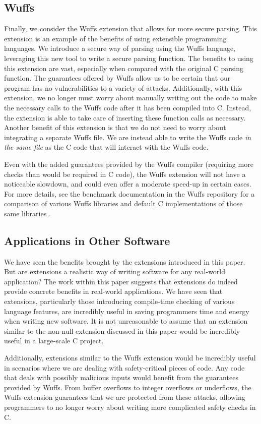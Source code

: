 \documentclass[main.tex]{subfiles}
\begin{document}
\subsection{Wuffs}
Finally, we consider the Wuffs extension that allows for more secure parsing. This extension is an example of
the benefits of using extensible programming languages. We introduce a secure way of parsing using the Wuffs language,
leveraging this new tool to write a secure parsing function. The benefits to using this extension are vast, especially when
compared with the original C parsing function. The guarantees offered by Wuffs allow us to be certain that our program has
no vulnerabilities to a variety of attacks. Additionally, with this extension, we no longer must worry about manually writing out
the code to make the necessary calls to the Wuffs code after it has been compiled into C. Instead, the extension is able to
take care of inserting these function calls as necessary. Another benefit of this extension is that we do not need to worry about
integrating a separate Wuffs file. We are instead able to write the Wuffs code \emph{in the same file} as the C code that will interact with
the Wuffs code.

Even with the added guarantees provided by the Wuffs compiler (requiring more checks than would be required in C code),
the Wuffs extension will not have a noticeable slowdown, and could even offer a moderate speed-up in certain cases. For
more details, see the benchmark documentation in the Wuffs repository for a comparison of various Wuffs libraries and
default C implementations of those same libraries \cite{6}. 

\subsection{Applications in Other Software}
We have seen the benefits brought by the extensions introduced in this paper. But are extensions a realistic way of writing
software for any real-world application? The work within this paper suggests that extensions do indeed provide concrete
benefits in real-world applications. We have seen that extensions, particularly those introducing compile-time checking of
various language features, are incredibly useful in saving programmers time and energy when writing new software. It is not
unreasonable to assume that an extension similar to the non-null extension discussed in this paper would be incredibly useful
in a large-scale C project.

Additionally, extensions similar to the Wuffs extension would be incredibly useful in scenarios where we are dealing with
safety-critical pieces of code. Any code that deals with possibly malicious inputs would benefit from the guarantees provided
by Wuffs. From buffer overflows to integer overflows or underflows, the Wuffs extension guarantees that we are protected from
these attacks, allowing programmers to no longer worry about writing more complicated safety checks in C.
\end{document}
